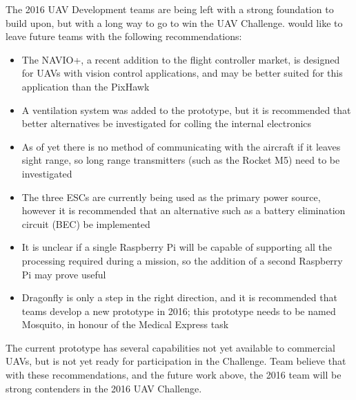 The 2016 UAV Development teams are being left with a strong foundation to build upon, but with a long way to go to win the UAV Challenge. \ID would like to leave future teams with the following recommendations:

\begin{itemize}
	\item The NAVIO+\cite{ref:navio}, a recent addition to the flight controller market, is designed for UAVs with vision control applications, and may be better suited for this application than the PixHawk
	\item A ventilation system was added to the prototype, but it is recommended that better alternatives be investigated for colling the internal electronics
	\item As of yet there is no method of communicating with the aircraft if it leaves sight range, so long range transmitters (such as the Rocket M5) need to be investigated
	\item The three ESCs are currently being used as the primary power source, however it is recommended that an alternative such as a battery elimination circuit (BEC) be implemented
	\item It is unclear if a single Raspberry Pi will be capable of supporting all the processing required during a mission, so the addition of a second Raspberry Pi may prove useful
	\item Dragonfly is only a step in the right direction, and it is recommended that teams develop a new prototype in 2016; this prototype needs to be named Mosquito, in honour of the Medical Express task
\end{itemize}

The current prototype has several capabilities not yet available to commercial UAVs, but is not yet ready for participation in the Challenge. Team \ID believe that with these recommendations, and the future work above, the 2016 team will be strong contenders in the 2016 UAV Challenge.